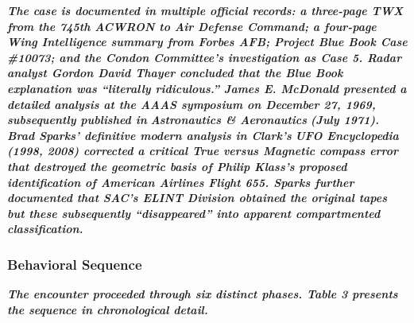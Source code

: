 \documentclass[11pt,letterpaper]{article}
\begin{document}
\textbf{\textit{The case is documented in multiple official records: a three-page TWX from the 745th ACWRON to Air Defense Command; a four-page Wing Intelligence summary from Forbes AFB; Project Blue Book Case \#10073; and the Condon Committee's investigation as Case 5. Radar analyst Gordon David Thayer concluded that the Blue Book explanation was ``literally ridiculous.'' James E. McDonald presented a detailed analysis at the AAAS symposium on December 27, 1969, subsequently published in }}\textbf{\textit{Astronautics \& Aeronautics}}\textbf{\textit{ (July 1971). Brad Sparks' definitive modern analysis in Clark's }}\textbf{\textit{UFO Encyclopedia}}\textbf{\textit{ (1998, 2008) corrected a critical True versus Magnetic compass error that destroyed the geometric basis of Philip Klass's proposed identification of American Airlines Flight 655. Sparks further documented that SAC's ELINT Division obtained the original tapes but these subsequently ``disappeared'' into apparent compartmented classification.}}


\subsubsection{Behavioral Sequence}

\textbf{\textit{The encounter proceeded through six distinct phases. Table 3 presents the sequence in chronological detail.}}
\end{document}
